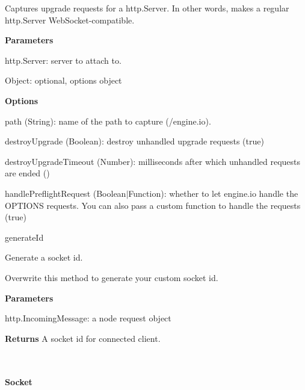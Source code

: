 \begin{DoxyItemize}
\begin{DoxyItemize}
\item Captures {\ttfamily upgrade} requests for a {\ttfamily http.\+Server}. In other words, makes a regular http.\+Server Web\+Socket-\/compatible.
\item {\bfseries Parameters}
\begin{DoxyItemize}
\item {\ttfamily http.\+Server}\+: server to attach to.
\item {\ttfamily Object}\+: optional, options object
\end{DoxyItemize}
\item {\bfseries Options}
\begin{DoxyItemize}
\item {\ttfamily path} ({\ttfamily String})\+: name of the path to capture ({\ttfamily /engine.io}).
\item {\ttfamily destroy\+Upgrade} ({\ttfamily Boolean})\+: destroy unhandled upgrade requests ({\ttfamily true})
\item {\ttfamily destroy\+Upgrade\+Timeout} ({\ttfamily Number})\+: milliseconds after which unhandled requests are ended ({})
\item {\ttfamily handle\+Preflight\+Request} ({\ttfamily Boolean$\vert$\+Function})\+: whether to let engine.\+io handle the O\+P\+T\+I\+O\+NS requests. You can also pass a custom function to handle the requests ({\ttfamily true})
\end{DoxyItemize}
\end{DoxyItemize}
\item {\ttfamily generate\+Id}
\begin{DoxyItemize}
\item Generate a socket id.
\item Overwrite this method to generate your custom socket id.
\item {\bfseries Parameters}
\begin{DoxyItemize}
\item {\ttfamily http.\+Incoming\+Message}\+: a node request object
\end{DoxyItemize}
\end{DoxyItemize}
\end{DoxyItemize}

{\bfseries Returns} A socket id for connected client.



~\newline


\paragraph*{Socket}

